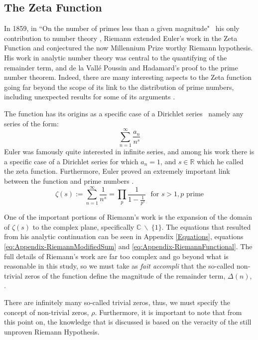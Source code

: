 \subsection{The Zeta Function} \label{The Zeta Function}
In 1859, in ``On the number of primes less than a given magnitude" \textendash\ his only contribution to number theory \citep{derbyshire2003prime}, Riemann extended Euler's work in the Zeta Function and conjectured the now Millennium Prize worthy Riemann hypothesis. His work in analytic number theory was central to the quantifying of the remainder term, and de la Vall\'{e} Poussin and Hadamard's proof to the prime number theorem. Indeed, there are many interesting aspects to the Zeta function going far beyond the scope of its link to the distribution of prime numbers, including unexpected results for some of its arguments \citep[p.153]{derbyshire2003prime}.

The function has its origins as a specific case of a Dirichlet series \textendash\ namely any series of the form:
	\begin{equation*}
		\sum_{n=1}^{\infty} \frac{a_n}{n^s}
	\end{equation*}
Euler was famously quite interested in infinite series, and among his work there is a specific case of a Dirichlet series for which $a_n = 1$, and $s \in \mathbb{R}$ which he called the zeta function. Furthermore, Euler proved an extremely important link between the function and prime numbers \citep[p.135]{derbyshire2003prime}.
	\begin{equation} \label{eq:EulerZeta}
		\zeta(s) := \sum_{n=1}^{\infty} \frac{1}{n^s} = \prod_{p} \frac{1}{1- \frac{1}{p^s}} \ \ \  \text{for } s > 1, p \text{ prime}
	\end{equation}

One of the important portions of Riemann's work is the expansion of the domain of $\zeta(s)$ to the complex plane, specifically $ \mathbb{C} \ \backslash \ \{1\}$. The equations that resulted from his analytic continuation can be seen in Appendix \ref{Equations}, equations \ref{eq:Appendix-RiemannModifiedSum} and \ref{eq:Appendix-RiemannFunctional}. The full details of Riemann's work are far too complex and go beyond what is reasonable in this study, so we must take as \textit{fait accompli} that the so-called non-trivial zeros of the function define the magnitude of the remainder term, $\Delta(n)$, \citep{Grime2014Youtube}.

There are infinitely many so-called trivial zeros\footnotemark, thus, we must specify the concept of non-trivial zeros, $\rho$. Furthermore, it is important to note that from this point on, the knowledge that is discussed is based on the veracity of the still unproven Riemann Hypothesis.

